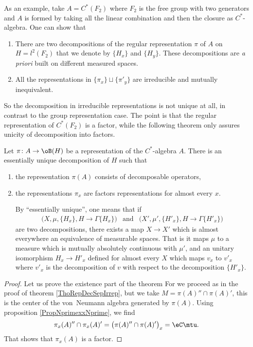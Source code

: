 As an example, take $A=C^*(F_2)$ where $F_2$ is the free group with two generators and $A$ is formed by taking all the linear combination and then the closure as $C^*$-algebra. One can show that
\begin{enumerate}
	\item There are two decompositions of the regular representation $\pi$ of $A$ on $H=l^2(F_2)$ that we denote by $\{ H_x \}$ and $\{ H_y \}$. These decompositions are \emph{a priori} built on different measured spaces.
	\item All the representations in $\{ \pi_x \}\sqcup\{ \pi'_y \}$ are irreducible and mutually inequivalent.
\end{enumerate}
So the decomposition in irreducible representations is not unique at all, in contrast to the group representation case. The point is that the regular representation of $C^*(F_2)$ is a factor, while the following theorem only assures unicity of decomposition into factors.

\begin{theorem}
	Let $\pi\colon A\to \oB(H)$ be a representation of the $C^*$-algebra $A$. There is an essentially unique decomposition of $H$ such that 
	\begin{enumerate}
		\item the representation $\pi(A)$ consists of decomposable operators,
		\item the representations $\pi_x$ are factors representations for almost every $x$.

		By ``essentially unique'', one means that if 
		\begin{align}
			\big( X,\mu,\{ H_x \}, H\to\Gamma\{ H_x \} \big)&\text{and}&\big( X',\mu',\{ H'_x \}, H\to\Gamma\{ H'_x \} \big)
		\end{align}
		are two decompositions, there exists a map $X\to X'$ which is almost everywhere an equivalence of measurable spaces. That is it maps $\mu$ to a measure which is mutually absolutely continuous with $\mu'$, and an unitary isomorphism $H_x\to H'_x$ defined for almost every $X$ which maps $v_x$ to $v'_x$ where $v'_x$ is the decomposition of $v$ with respect to the decomposition $\{ H'_x \}$.
	\end{enumerate}
\end{theorem}

\begin{proof}
	Let us prove the existence part of the theorem For we proceed as in the proof of theorem \ref{ThoRepDecSepIrrep}, but we take $M=\pi(A)''\cap\pi(A)'$, this is the center of the von~Neumann algebra generated by $\pi(A)$. Using proposition \ref{PropNprimexxNprime}, we find
	\begin{equation}
		\pi_x(A)''\cap\pi_x(A)'=\big( \pi(A)''\cap\pi(A)' \big)_x=\eC\mtu.
	\end{equation}
	That shows that $\pi_x(A)$ is a factor.
\end{proof}

